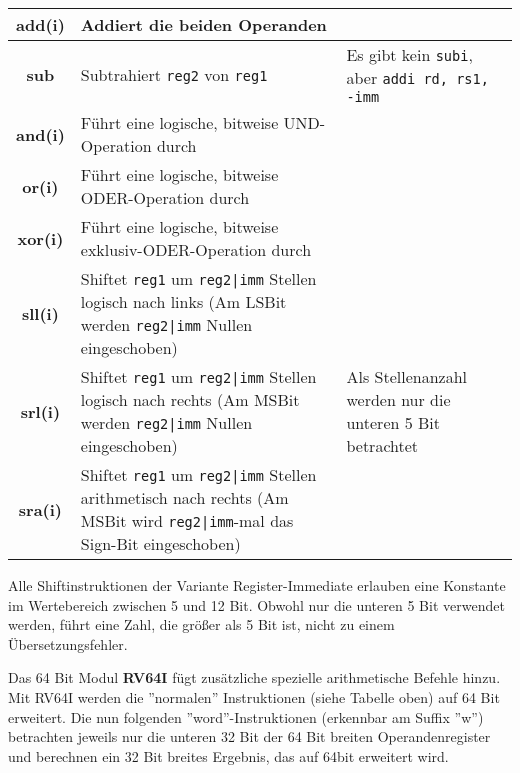 \begin{tabular}{|c|p{8cm}|p{4cm}|}
	\hline
	\textbf{add(i)} & Addiert die beiden Operanden & \\
	\hline
	\textbf{sub} & Subtrahiert \texttt{reg2} von \texttt{reg1}& Es gibt kein \texttt{subi}, aber \texttt{addi rd, rs1, -imm} \\
	\hline
	\textbf{and(i)} & Führt eine logische, bitweise UND-Operation durch & \\
	\hline
	\textbf{or(i)} & Führt eine logische, bitweise ODER-Operation durch & \\
	\hline
	\textbf{xor(i)} & Führt eine logische, bitweise exklusiv-ODER-Operation durch & \\
	\hline
	\textbf{sll(i)} & Shiftet \texttt{reg1} um \texttt{reg2|imm} Stellen logisch nach links (Am LSBit werden \texttt{reg2|imm} Nullen eingeschoben) & \multirow{3}{4cm}{Als Stellenanzahl werden nur die unteren 5 Bit betrachtet} \\
	\cline{1-2}
	\textbf{srl(i)} & Shiftet \texttt{reg1} um \texttt{reg2|imm} Stellen logisch nach rechts (Am MSBit werden \texttt{reg2|imm} Nullen eingeschoben) & \\
	\cline{1-2}
	\textbf{sra(i)} & Shiftet \texttt{reg1} um \texttt{reg2|imm} Stellen arithmetisch nach rechts (Am MSBit wird \texttt{reg2|imm}-mal das Sign-Bit eingeschoben) & \\
	\hline
\end{tabular}

\begin{warningblock}
	Alle Shiftinstruktionen der Variante Register-Immediate erlauben eine Konstante im Wertebereich zwischen 5 und 12 Bit. Obwohl nur die unteren 5 Bit verwendet werden, führt eine Zahl, die größer als 5 Bit ist, nicht zu einem Übersetzungsfehler.
\end{warningblock}
Das 64 Bit Modul \textbf{RV64I} fügt zusätzliche spezielle arithmetische Befehle hinzu. Mit RV64I werden die ''normalen'' Instruktionen (siehe Tabelle oben) auf 64 Bit erweitert. Die nun folgenden ''word''-Instruktionen (erkennbar am Suffix ''w'') betrachten jeweils nur die unteren 32 Bit der 64 Bit breiten Operandenregister und berechnen ein 32 Bit breites Ergebnis, das auf 64bit erweitert wird.\\


